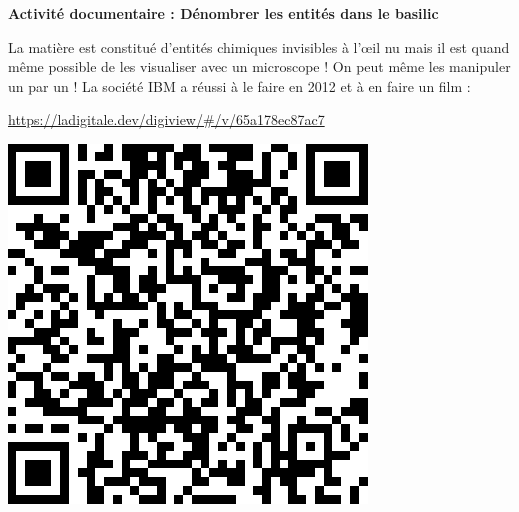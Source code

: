 
\renewcommand{\thesubsection}{\textcolor{red}{\Roman{section}.\arabic{subsection}}}
\renewcommand{\thesubsubsection}{\textcolor{red}{\Roman{section}.\arabic{subsection}.\alph{subsubsection}}}

\setcounter{section}{0}
\setcounter{document}{0}

\begin{center}
\begin{mdframed}[style=titr, leftmargin=60pt, rightmargin=60pt, innertopmargin=7pt, innerbottommargin=7pt, innerrightmargin=8pt, innerleftmargin=8pt]

\begin{center}
\large{\textbf{Activité documentaire : Dénombrer les entités dans le basilic}}
\end{center}

\end{mdframed}
\end{center}

\begin{tcolorbox}[colback=orange!5!white,colframe=orange!75!black,title= Contexte de l'activité]
\begin{minipage}{0.7\textwidth}
    La matière est constitué d'entités chimiques invisibles à l'\oe il nu mais il est quand même possible de les visualiser avec un microscope ! On peut même les manipuler un par un ! La société IBM a réussi à le faire en 2012 et à en faire un film :
    \begin{center}
        \url{https://ladigitale.dev/digiview/#/v/65a178ec87ac7}
    \end{center}

\end{minipage}
\begin{minipage}{0.25\textwidth}
    \begin{center}
        \includegraphics[scale=0.3]{Images/Qrcode_IBM.png}
    \end{center}
\end{minipage}
\end{tcolorbox}

